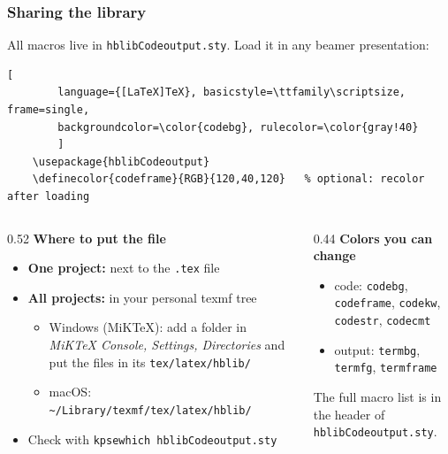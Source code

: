 \documentclass[aspectratio=169,10pt,compress]{beamer}
\newcommand{\cmd}[1]{\texttt{\color{gitred}#1}}
\begin{document}
\begin{frame}[t,fragile] \frametitle{Sharing the library}
  All macros live in \texttt{hblibCodeoutput.sty}. Load it in any beamer presentation:


\begin{lstlisting}[
		language={[LaTeX]TeX}, basicstyle=\ttfamily\scriptsize, frame=single,
		backgroundcolor=\color{codebg}, rulecolor=\color{gray!40}
		]
	\usepackage{hblibCodeoutput}
	\definecolor{codeframe}{RGB}{120,40,120}   % optional: recolor after loading
\end{lstlisting}


  \begin{columns}[T]
    \begin{column}{0.52\textwidth}
      \textbf{Where to put the file}
      \begin{itemize}\small
        \item \textbf{One project:} next to the \texttt{.tex} file
        \item \textbf{All projects:} in your personal texmf tree
              \begin{itemize}\footnotesize
                \item Windows (MiKTeX): add a folder in \emph{MiKTeX Console, Settings, Directories}
                      and put the files in its \texttt{tex/latex/hblib/}
                \item macOS: \texttt{\textasciitilde/Library/texmf/tex/latex/hblib/}
              \end{itemize}
        \item Check with \cmd{kpsewhich hblibCodeoutput.sty}
      \end{itemize}
    \end{column}
    \begin{column}{0.44\textwidth}
      \textbf{Colors you can change}
      \begin{itemize}\small
        \item code: \texttt{codebg}, \texttt{codeframe}, \texttt{codekw}, \texttt{codestr}, \texttt{codecmt}
        \item output: \texttt{termbg}, \texttt{termfg}, \texttt{termframe}
      \end{itemize}
      \small The full macro list is in the header of \texttt{hblibCodeoutput.sty}.
    \end{column}
  \end{columns}
\end{frame}
\end{document}
